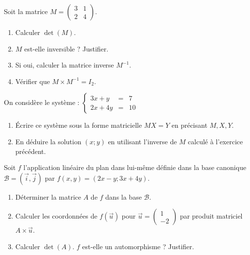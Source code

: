 \documentclass[11pt]{article}
\begin{document}
\begin{exercice}
Soit la matrice $M = \begin{pmatrix} 3 & 1 \\ 2 & 4 \end{pmatrix}$.
\begin{enumerate}
    \item Calculer $\det(M)$.
    \item $M$ est-elle inversible ? Justifier.
    \item Si oui, calculer la matrice inverse $M^{-1}$.
    \item Vérifier que $M \times M^{-1} = I_2$.
\end{enumerate}
\end{exercice}

\begin{exercice}
On considère le système : 
$\left\{ \begin{array}{rcl} 3x + y &=& 7 \\ 2x + 4y &=& 10 \end{array} \right.$
\begin{enumerate}
    \item Écrire ce système sous la forme matricielle $M X = Y$ en précisant $M, X, Y$.
    \item En déduire la solution $(x; y)$ en utilisant l'inverse de $M$ calculé à l'exercice précédent.
\end{enumerate}
\end{exercice}

\begin{exercice}
Soit $f$ l'application linéaire du plan dans lui-même définie dans la base canonique $\mathcal{B} = (\vec{i}, \vec{j})$ par $f(x, y) = (2x - y ; 3x + 4y)$.
\begin{enumerate}
    \item Déterminer la matrice $A$ de $f$ dans la base $\mathcal{B}$.
    \item Calculer les coordonnées de $f(\vec{u})$ pour $\vec{u} = \begin{pmatrix} 1 \\ -2 \end{pmatrix}$ par produit matriciel $A \times \vec{u}$.
    \item Calculer $\det(A)$. $f$ est-elle un automorphisme ? Justifier.
\end{enumerate}
\end{exercice}
\end{document}
